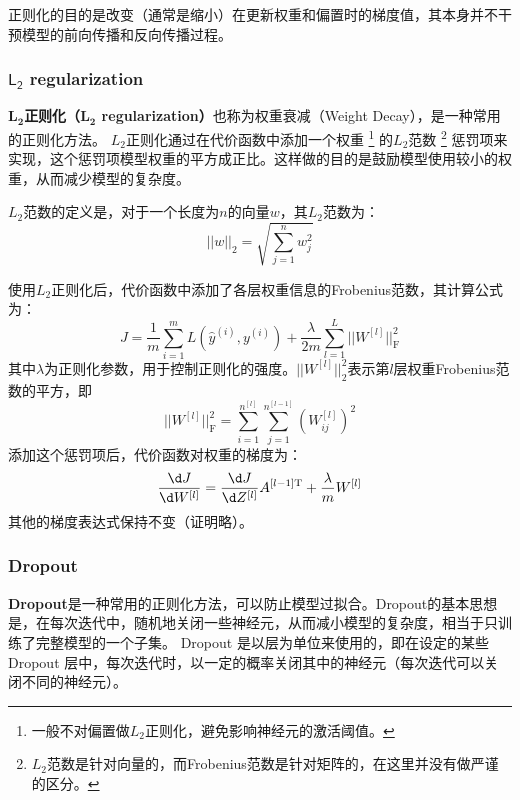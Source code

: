 \begin{hint}
    正则化的目的是改变（通常是缩小）在更新权重和偏置时的梯度值，其本身并不干预模型的前向传播和反向传播过程。
\end{hint}

\subsubsection{$\mathsf{L_2}$ regularization}

\textbf{$\bm{L_2}$正则化（$\bm{L_2}$ regularization）}也称为权重衰减（Weight Decay），是一种常用的正则化方法。
$L_2$正则化通过在代价函数中添加一个权重
\footnote{一般不对偏置做$L_2$正则化，避免影响神经元的激活阈值。}
的$L_2$范数
\footnote{$L_2$范数是针对向量的，而Frobenius范数是针对矩阵的，在这里并没有做严谨的区分。}
惩罚项来实现，这个惩罚项模型权重的平方成正比。这样做的目的是鼓励模型使用较小的权重，从而减少模型的复杂度。

$L_2$范数的定义是，对于一个长度为$n$的向量$w$，其$L_2$范数为：
\begin{equation}
    ||w||_2 = \sqrt{\sum_{j=1}^nw_j^2}
\end{equation}

使用$L_2$正则化后，代价函数中添加了各层权重信息的Frobenius范数，其计算公式为：
\begin{equation}
    J = \frac{1}{m}\sum_{i=1}^mL(\hat{y}^{(i)}, y^{(i)}) + \frac{\lambda}{2m}\sum_{l=1}^L||W^{[l]}||_{\mathrm{F}}^2
\end{equation}
其中$\lambda$为正则化参数，用于控制正则化的强度。$||W^{[l]}||_2^2$表示第$l$层权重Frobenius范数的平方，即
\begin{equation}
    ||W^{[l]}||_{\mathrm{F}}^2 = \sum_{i=1}^{n^{[l]}}\sum_{j=1}^{n^{[l-1]}}(W_{ij}^{[l]})^2
\end{equation}
添加这个惩罚项后，代价函数对权重的梯度为：
\begin{equation}
    \frac{\d J}{\d W^{[l]}} = \frac{\d J}{\d Z^{[l]}} A^{[l-1] \mathrm{T}} + \frac{\lambda}{m}W^{[l]}
\end{equation}
其他的梯度表达式保持不变（证明略）。

\subsubsection{Dropout}

\textbf{Dropout}是一种常用的正则化方法，可以防止模型过拟合。Dropout的基本思想是，在每次迭代中，随机地关闭一些神经元，从而减小模型的复杂度，相当于只训练了完整模型的一个子集。
Dropout 是以层为单位来使用的，即在设定的某些 Dropout 层中，每次迭代时，以一定的概率关闭其中的神经元（每次迭代可以关闭不同的神经元）。

